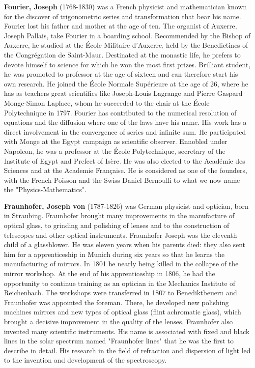 \textbf{Fourier, Joseph} (1768-1830) was a French physicist and mathematician known for the discover of trigonometric series and transformation that bear his name. Fourier lost his father and mother at the age of ten. The organist of Auxerre, Joseph Pallais, take Fourier in a boarding school. Recommended by the Bishop of Auxerre, he studied at the École Militaire d'Auxerre, held by the Benedictines of the Congrégation de Saint-Maur. Destinated at the monastic life, he prefers to devote himself to science for which he won the most first prizes. Brilliant student, he was promoted to professor at the age of sixteen and can therefore start his own research. He joined the École Normale Supérieure at the age of 26, where he has as teachers great scientifics like Joseph-Louis Lagrange and Pierre Gaspard Monge-Simon Laplace, whom he succeeded to the chair at the École Polytechnique in 1797. Fourier has contributed to the numerical resolution of equations and the diffusion where one of the laws have his name. His work has a direct involvement in the convergence of series and infinite sum. He participated with Monge at the Egypt campaign as scientific observer. Ennobled under Napoleon, he was a professor at the École Polytechnique, secretary of the Institute of Egypt and Prefect of Isère. He was also elected to the Académie des Sciences and at the Academie Française. He is considered as one of the founders, with the French Poisson and the Swiss Daniel Bernoulli to what we now name the "Physics-Mathematics".

\textbf{Fraunhofer, Joseph von} (1787-1826) was  German physicist and optician, born in Straubing. Fraunhofer brought many improvements in the manufacture of optical glass, to grinding and polishing of lenses and to the construction of telescopes and other optical instruments. Fraunhofer Joseph was the eleventh child of a glassblower. He was eleven years when his parents died: they also sent him for a apprenticeship in Munich during six years so that he learns the manufacturing of mirrors. In 1801 he nearly being killed in the collapse of the mirror workshop. At the end of his apprenticeship in 1806, he had the opportunity to continue training as an optician in the Mechanics Institute of Reichenbach. The workshops were transferred in 1807 to Benediktbeuern and Fraunhofer was appointed the foreman. There, he developed new polishing machines mirrors and new types of optical glass (flint achromatic glass), which brought a decisive improvement in the quality of the lenses. Fraunhofer also invented many scientific instruments. His name is associated with fixed and black lines in the solar spectrum named "Fraunhofer lines" that he was the first to describe in detail. His research in the field of refraction and dispersion of light led to the invention and development of the spectroscopy.

